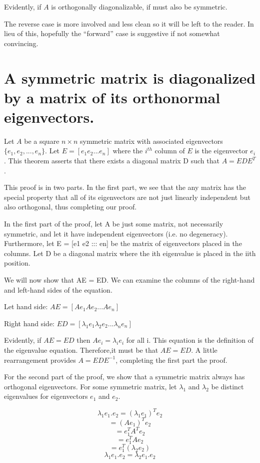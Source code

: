 \documentclass[12pt,notitlepage,oneside]{report}
\begin{document}
Evidently, if $A$ is orthogonally diagonalizable, if must also be symmetric.

The reverse case is more involved and less clean so it will be
left to the reader. In lieu of this, hopefully the ``forward'' case
is suggestive if not somewhat convincing.

\section{A symmetric matrix is diagonalized by a matrix of its orthonormal eigenvectors.}
Let $A$ be a square $n\times n$ symmetric matrix with associated eigenvectors $\{e_1,e_2,...,e_n\}.$ Let $E = [e_1 e_2 ... e_n]$ where the $i^{th}$ column of $E$ is the eigenvector $e_i$. This theorem asserts that there exists a diagonal matrix D such that $ A = EDE^T$.

This proof is in two parts. In the first part, we see that the any matrix has the special property that all of its eigenvectors are not just linearly independent but also orthogonal, thus completing our proof.

In the first part of the proof, let A be just some matrix, not
necessarily symmetric, and let it have independent eigenvectors (i.e. no degeneracy). Furthermore, let E = [e1 e2 ::: en]
be the matrix of eigenvectors placed in the columns. Let D be
a diagonal matrix where the ith eigenvalue is placed in the iith
position.

We will now show that AE = ED. We can examine the columns of the right-hand and left-hand sides of the equation.

\begin{center}
	Let hand side: $ AE = [Ae_1 Ae_2 ... Ae_n]$
\end{center}
\begin{center}
	Right hand side: $ ED = [\lambda_1 e_1 \lambda_2 e_2 ... \lambda_n e_n]$
\end{center}

Evidently, if $AE = ED$ then $Ae_i = \lambda_i e_i$ for all i. This equation is 
the definition of the eigenvalue equation. Therefore,it must be that $AE = ED$. A little rearrangement provides $A = EDE^{-1}$, completing the first part the proof.


For the second part of the proof, we show that a symmetric matrix always has orthogonal eigenvectors. For some symmetric matrix, let $\lambda_1$ and $\lambda_2$ be distinct eigenvalues for eigenvectors $e_1$ and $e_2$.

$$ \lambda_1 e_1 .e_2 = (\lambda_1 e_1)^T e_2$$
$$ = (Ae_1)^T e_2 $$
$$ = e_1^T A^T e_2 $$
$$ = e_1^T A e_2 $$
$$ = e_1^T(\lambda_2 e_2) $$
$$ \lambda_1 e_1 .e_2 = \lambda_2 e_1.e_2 $$
\end{document}
